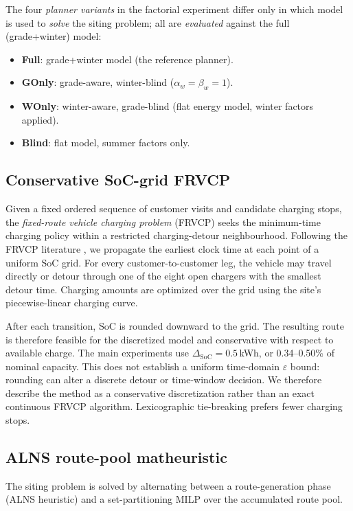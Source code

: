 \documentclass[review,3p,authoryear]{elsarticle}
\newcommand{\SoC}{\mathrm{SoC}}
\begin{document}
The four \emph{planner variants} in the factorial experiment differ only
in which model is used to \emph{solve} the siting problem; all are
\emph{evaluated} against the full (grade+winter) model:
\begin{itemize}
  \item \textbf{Full}: grade+winter model (the reference planner).
  \item \textbf{GOnly}: grade-aware, winter-blind ($\alpha_w = \beta_w = 1$).
  \item \textbf{WOnly}: winter-aware, grade-blind (flat energy model,
    winter factors applied).
  \item \textbf{Blind}: flat model, summer factors only.
\end{itemize}

\subsection{Conservative SoC-grid FRVCP}
\label{sec:frvcp}

Given a fixed ordered sequence of customer visits and candidate charging
stops, the \emph{fixed-route vehicle charging problem} (FRVCP) seeks
the minimum-time charging policy within a restricted charging-detour
neighbourhood.  Following the FRVCP literature
\citep{Montoya2017,Froger2019}, we propagate the earliest clock time at each
point of a uniform SoC grid.  For every customer-to-customer leg, the vehicle
may travel directly or detour through one of the eight open chargers with
the smallest detour time.  Charging amounts are optimized over the grid
using the site's piecewise-linear charging curve.

After each transition, SoC is rounded downward to the grid.  The resulting
route is therefore feasible for the discretized model and conservative with
respect to available charge.  The main experiments use
$\Delta_{\SoC}=0.5$\,kWh, or 0.34--0.50\% of nominal capacity.  This does
not establish a uniform time-domain $\varepsilon$ bound: rounding can alter
a discrete detour or time-window decision.  We therefore describe the method
as a conservative discretization rather than an exact continuous FRVCP
algorithm.  Lexicographic tie-breaking prefers fewer charging stops.

\subsection{ALNS route-pool matheuristic}
\label{sec:alns}

The siting problem is solved by alternating between a route-generation
phase (ALNS heuristic) and a set-partitioning MILP over the accumulated
route pool.
\end{document}
